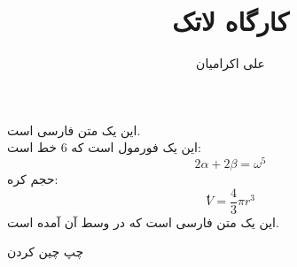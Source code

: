 \documentclass[12pt]{article}
\title{کارگاه لاتک}
\author{علی اکرامیان}
\begin{document}
	\maketitle
	این یک متن فارسی است.\\
این یک فورمول است که 6 خط است:
\[ 2 \alpha + 2 \beta = \omega^5 \]
حجم کره:
\[ٰ V = \frac{4}{3} \pi r^3\]
این یک متن فارسی است که در وسط آن  آمده است. 
\begin{flushleft}
	چپ چین کردن
\end{flushleft}
\end{document}
